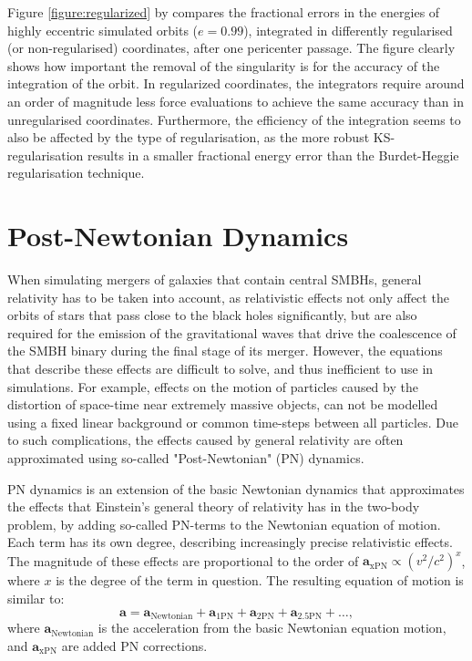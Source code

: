 \documentclass[english, twoside]{HYgradu}
\begin{document}
Figure \ref{figure:regularized} by \cite{BinneyTremaine} compares the fractional errors in the energies of highly eccentric simulated orbits ($e = 0.99$), integrated in differently regularised (or non-regularised) coordinates, after one pericenter passage. The figure clearly shows how important the removal of the singularity is for the accuracy of the integration of the orbit. In regularized coordinates, the integrators require around an order of magnitude less force evaluations to achieve the same accuracy than in unregularised coordinates. Furthermore, the efficiency of the integration seems to also be affected by the type of regularisation, as the more robust KS-regularisation results in a smaller fractional energy error than the Burdet-Heggie regularisation technique.

\section{Post-Newtonian Dynamics} \label{section:PN}

When simulating mergers of galaxies that contain central SMBHs, general relativity has to be taken into account, as relativistic effects not only affect the orbits of stars that pass close to the black holes significantly, but are also required for the emission of the gravitational waves that drive the coalescence of the SMBH binary during the final stage of its merger. However, the equations that describe these effects are difficult to solve, and thus inefficient to use in simulations. For example, effects on the motion of particles caused by the distortion of space-time near extremely massive objects, can not be modelled using a fixed linear background or common time-steps between all particles. Due to such complications, the effects caused by general relativity are often approximated using so-called "Post-Newtonian" (PN) dynamics.

PN dynamics is an extension of the basic Newtonian dynamics that approximates the effects that Einstein's general theory of relativity has in the two-body problem, by adding so-called PN-terms to the Newtonian equation of motion. Each term has its own degree, describing increasingly precise relativistic effects. The magnitude of these effects are proportional to the order of $\mathbf{a}_\mathrm{xPN} \propto \left( v^2 / c^2 \right)^x$, where $x$ is the degree of the term in question. The resulting equation of motion is similar to:
\begin{equation}
\mathbf{a} = \mathbf{a}_\mathrm{Newtonian} + \mathbf{a}_\mathrm{1PN} + \mathbf{a}_\mathrm{2PN} + \mathbf{a}_\mathrm{2.5PN} + \ldots, \label{eq:PN_eom}
\end{equation}
where $\mathbf{a}_\mathrm{Newtonian}$ is the acceleration from the basic Newtonian equation motion, and $\mathbf{a}_\mathrm{xPN}$ are added PN corrections.
\end{document}
